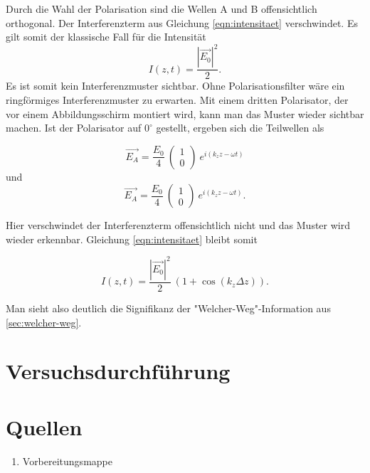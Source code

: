 \documentclass[a4paper,ngerman]{scrartcl}
\begin{document}
Durch die Wahl der Polarisation sind die Wellen A und B offensichtlich orthogonal. Der Interferenzterm aus Gleichung \ref{eqn:intensitaet} verschwindet. Es gilt somit der klassische Fall für die Intensität
\begin{equation}
I(z,t) = \frac{|\vec{E_0}|^2}{2}.
\end{equation}
Es ist somit kein Interferenzmuster sichtbar. 
Ohne Polarisationsfilter wäre ein ringförmiges Interferenzmuster zu erwarten.
Mit einem dritten Polarisator, der vor einem Abbildungsschirm montiert wird, kann man das Muster wieder sichtbar machen. 
Ist der Polarisator auf $0^{\circ}$ gestellt, ergeben sich die Teilwellen als

\begin{equation}
\vec{E_A} = \frac{E_0}{4} \ \begin{pmatrix} 1\\ 0 \end{pmatrix} \ e^{i (k_z z -\omega t)}
\end{equation}
und
\begin{equation}
\vec{E_A} = \frac{E_0}{4} \ \begin{pmatrix} 1\\ 0 \end{pmatrix} \ e^{i (k_z z -\omega t)}.
\end{equation}

Hier verschwindet der Interferenzterm offensichtlich nicht und das Muster wird wieder erkennbar. Gleichung \ref{eqn:intensitaet} bleibt somit

\begin{equation}
I(z,t) = \frac{|\vec{E_0}|^2}{2} \ (1+\cos(k_z\Delta z) ).
\end{equation}

Man sieht also deutlich die Signifikanz der "Welcher-Weg"-Information aus \ref{sec:welcher-weg}.


\section{Versuchsdurchführung}
\label{sec:versuchsdurchfuhrung}








\clearpage
\section{Quellen}
\begin{enumerate}
\item Vorbereitungsmappe \label{ref:mappe}
\end{enumerate}
\end{document}
